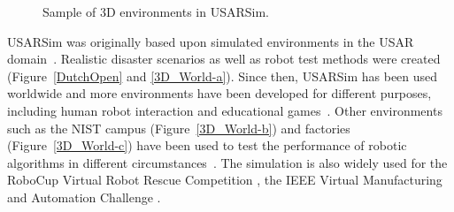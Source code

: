 \begin{figure}[hbt!]
\centering
{}\qquad
{}\qquad%
\qquad
{}
\caption{Sample of 3D environments in USARSim.} \label{3D_World}
\end{figure}

USARSim was originally based upon simulated environments in the USAR domain~\cite{WANG.WSC.2003}. Realistic disaster scenarios as well as robot test methods were created (Figure~\ref{DutchOpen} and \ref{3D_World-a}).
Since then, USARSim has been used worldwide and more environments have been developed for different purposes, including human robot interaction and educational games~\cite{Balakirsky2009iros}. Other environments such as the NIST campus (Figure~\ref{3D_World-b}) and factories (Figure~\ref{3D_World-c}) have been used to test the performance of robotic algorithms in different circumstances~\cite{BALAGUER.IROS.2008,WANG.HFES.2005}. %
The simulation is also widely used for the RoboCup Virtual Robot Rescue Competition \cite{Akin2013}, the IEEE Virtual Manufacturing and Automation Challenge \cite{Balakirsky2012challenge}.




